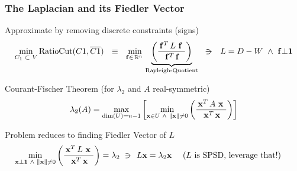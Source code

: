 \begin{frame}
  \frametitle{The Laplacian and its Fiedler Vector}
  \begin{block}{Approximate by removing discrete constraints (signs)}
    \[
\joinabove{0}
\min\limits_{C_1 \ds{\subset} V} \func{RatioCut}(C1,\stcomp{C1})
\ds{\ds{\equiv}}
\min\limits_{\vec{f} \in \R{n}}
  \underbrace{
    \left(\dfrac{\trans{\vec{f}} L \ds{\vec{f}}}{\trans{\vec{f}} \vec{f}}\right)
  }_{\text{Rayleigh-Quotient}}    
\ds{\suchthat}
L = D - W
\ds{\land}
\vec{f} \bot \vec{1}
\joinbelow{0}
\]    
  \end{block}
  \begin{block}{Courant-Fischer Theorem (for $\lambda_2$ and $A$ real-symmetric)}
\[
\joinabove{0}
\lambda_2(A) =
\max\limits_{\func{dim}(U) = n-1}
\left[
\min\limits_{\vec{x} \in U \ds{\land} \norm{\vec{x}} \ne 0}
\left(  
\dfrac{\trans{\vec{x}} A \ds{\vec{x}}}{\trans{\vec{x}} \vec{x}}
\right)
\right]
\]    
  \end{block}

  \begin{block}{Problem reduces to finding Fiedler Vector of $L$}
\[
\min\limits_{\vec{x} \bot \vec{1} \ds{\land} \norm{\vec{x}} \ne 0}
\left(  
\dfrac{\trans{\vec{x}} L \ds{\vec{x}}}{\trans{\vec{x}} \vec{x}}
\right)
= \lambda_2
\suchthat{L\vec{x} = \lambda_2\vec{x}}
\ds{\ds{\ds{\ds{\text{($L$ is SPSD, leverage that!)}}}}}
\]    
  \end{block}
\end{frame}

